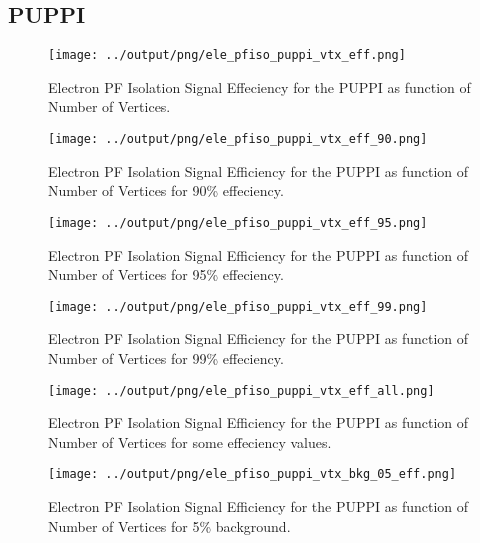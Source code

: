 \documentclass[11pt]{book}
\begin{document}
\subsection{PUPPI}
\begin{figure}[htb]
\centering
\texttt{[image: ../output/png/ele\_pfiso\_puppi\_vtx\_eff.png]}
\caption{Electron PF Isolation Signal Effeciency for the PUPPI as function of Number of Vertices.}
\label{fig:ele_pfiso_vtx_eff_puppi}
\end{figure}

\begin{figure}[htb]
\centering
\texttt{[image: ../output/png/ele\_pfiso\_puppi\_vtx\_eff\_90.png]}
\caption{Electron PF Isolation Signal Efficiency for the PUPPI as function of Number of Vertices for 90\% effeciency.}
\label{fig:ele_pfiso_vtx_eff_puppi_eff_90}
\end{figure}

\begin{figure}[htb]
\centering
\texttt{[image: ../output/png/ele\_pfiso\_puppi\_vtx\_eff\_95.png]}
\caption{Electron PF Isolation Signal Efficiency for the PUPPI as function of Number of Vertices for 95\% effeciency.}
\label{fig:ele_pfiso_vtx_eff_puppi_eff_95}
\end{figure}

\begin{figure}[htb]
\centering
\texttt{[image: ../output/png/ele\_pfiso\_puppi\_vtx\_eff\_99.png]}
\caption{Electron PF Isolation Signal Efficiency for the PUPPI as function of Number of Vertices for 99\% effeciency.}
\label{fig:ele_pfiso_vtx_eff_puppi_eff_99}
\end{figure}

\begin{figure}[htb]
\centering
\texttt{[image: ../output/png/ele\_pfiso\_puppi\_vtx\_eff\_all.png]}
\caption{Electron PF Isolation Signal Efficiency for the PUPPI as function of Number of Vertices for some effeciency values.}
\label{fig:ele_pfiso_vtx_eff_puppi_eff_all}
\end{figure}

\begin{figure}[htb]
\centering
\texttt{[image: ../output/png/ele\_pfiso\_puppi\_vtx\_bkg\_05\_eff.png]}
\caption{Electron PF Isolation Signal Efficiency for the PUPPI as function of Number of Vertices for 5\% background.}
\label{fig:ele_pfiso_vtx_eff_puppi_bkg_05_eff}
\end{figure}
\end{document}
